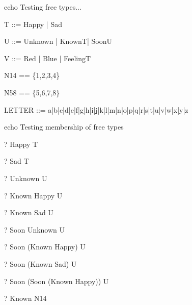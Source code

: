 %


echo Testing free types...

\begin{zed}
T ::= Happy | Sad
\end{zed}

\begin{zed}
U ::= Unknown | Known\ldata T\rdata | Soon\ldata U\rdata
\end{zed}

\begin{zed}
V ::= Red | Blue | Feeling\ldata T \rdata
\end{zed}

\begin{zed}
N14 == \{1,2,3,4\}
\end{zed}

\begin{zed}
N58 == \{5,6,7,8\}
\end{zed}

\begin{zed}
LETTER ::= a|b|c|d|e|f|g|h|i|j|k|l|m|n|o|p|q|r|s|t|u|v|w|x|y|z
\end{zed}

echo     Testing membership of free types
\begin{zed} \vdash?  Happy \in T \end{zed}
\begin{zed} \vdash?  Sad \in T \end{zed}
\begin{zed} \vdash?  Unknown \in U \end{zed}
\begin{zed} \vdash?  Known Happy \in U \end{zed}
\begin{zed} \vdash?  Known Sad \in U \end{zed}
\begin{zed} \vdash?  Soon Unknown \in U \end{zed}
\begin{zed} \vdash?  Soon (Known Happy) \in U \end{zed}
\begin{zed} \vdash?  Soon (Known Sad) \in U \end{zed}
\begin{zed} \vdash?  Soon (Soon (Known Happy)) \in U \end{zed}
\begin{zed} \vdash?  Known \notin N14 \end{zed}


